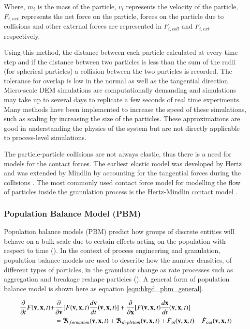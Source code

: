 \documentclass[preprint,11pt,authoryear]{elsarticle}
\begin{document}
Where, $m_i$ is the mass of the particle, $v_i$ represents the velocity of 
the particle, $F_{i,net}$  represents the net force on the particle, forces on the particle due to collisions 
and other external forces are represented in $F_{i,coll}$ and $F_{i,ext}$ respectively.

Using this method, the distance between each particle calculated at every time step and if the distance between two 
particles is less than the sum of the radii (for spherical particles)  a collision between the two particles 
is recorded. The tolerance for overlap is low in the normal as well as the tangential direction. 
Micro-scale DEM simulations are computationally demanding and simulations may take up to several 
days to replicate a few seconds of real time experiments. Many methods have been implemented to 
increase the speed of these simulations, such as scaling by increasing the size of the particles. These 
approximations are good in understanding the physics of the system but are not directly applicable to 
process-level simulations. 

The particle-particle collisions are not always elastic, thus there is a need for models for the 
contact forces. The earliest elastic model was developed by Hertz and was extended by Mindlin 
by accounting for the  tangential forces during the collisions \citep{adams2000}. The most commonly used contact 
force model for modelling the flow of particles inside the granulation process 
is the Hertz-Mindlin contact model \citep{gantt2006}\citep{hassanpour2013}. 
 

\subsubsection{Population Balance Model (PBM)}
     Population balance models (PBM) predict how groups of discrete entities will behave on a 
    bulk scale due to certain effects acting on the population with respect to time 
    (\cite{ramkrishna2014}). In the context of process engineering and granulation, population 
    balance models are used to describe how the number densities, of different types of particles, in 
    the granulator change as rate processes such as aggregation and breakage reshape particles 
    (\cite{Barrasso2013}). A general form of population balance model is shown here as equation 
    \ref{eqn:bkgd_pbm_general}.
    
    \begin{align}
    \frac{ \partial}{\partial t}F(\textbf{v},\textbf{x},t) +& \frac{\partial}{\partial 
        \textbf{v}}[F(\textbf{v},\textbf{x},t)\frac{d\textbf{v}}{dt}(\textbf{v},\textbf{x},t)] + 
    \frac{\partial}{\partial \textbf{x}}[F(\textbf{v},\textbf{x},t)\frac{d\textbf{x}}{dt}(\textbf{v},\textbf{x},t)] 
    \notag\\
    &= 
    \Re_{formation}(\textbf{v},\textbf{x},t)+\Re_{depletion}(\textbf{v},\textbf{x},t)+\dot{F}_{in}(\textbf{v},
    \textbf{x},t)-\dot{F}_{out}(\textbf{v},\textbf{x},t)
    \label{eqn:bkgd_pbm_general} 
    \end{align}
    
\end{document}
